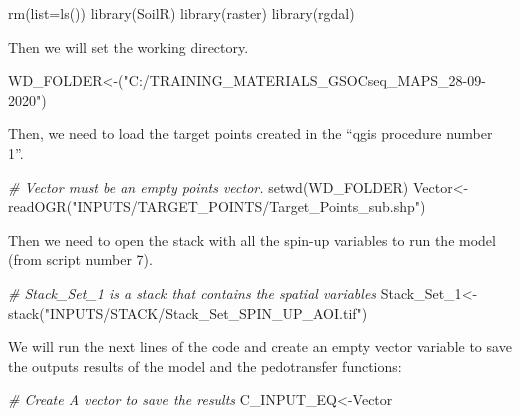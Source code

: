 \documentclass[
  10pt,
  b5paper,
]{book}
\newenvironment{Shaded}{\begin{snugshade}}{\end{snugshade}}
\newcommand{\AttributeTok}[1]{\textcolor[rgb]{0.77,0.63,0.00}{#1}}
\newcommand{\CommentTok}[1]{\textcolor[rgb]{0.56,0.35,0.01}{\textit{#1}}}
\newcommand{\FunctionTok}[1]{\textcolor[rgb]{0.00,0.00,0.00}{#1}}
\newcommand{\NormalTok}[1]{#1}
\newcommand{\OtherTok}[1]{\textcolor[rgb]{0.56,0.35,0.01}{#1}}
\newcommand{\StringTok}[1]{\textcolor[rgb]{0.31,0.60,0.02}{#1}}
\begin{document}
\begin{Shaded}
\begin{Highlighting}[]
\FunctionTok{rm}\NormalTok{(}\AttributeTok{list=}\FunctionTok{ls}\NormalTok{()) }
\FunctionTok{library}\NormalTok{(SoilR)}
\FunctionTok{library}\NormalTok{(raster)}
\FunctionTok{library}\NormalTok{(rgdal)}
\end{Highlighting}
\end{Shaded}

Then we will set the working directory.

\begin{Shaded}
\begin{Highlighting}[]
\NormalTok{WD\_FOLDER}\OtherTok{\textless{}{-}}\NormalTok{(}\StringTok{"C:/TRAINING\_MATERIALS\_GSOCseq\_MAPS\_28{-}09{-}2020"}\NormalTok{)}
\end{Highlighting}
\end{Shaded}

Then, we need to load the target points created in the ``qgis procedure number 1''.

\begin{Shaded}
\begin{Highlighting}[]
\CommentTok{\# Vector must be an empty points vector. }
\FunctionTok{setwd}\NormalTok{(WD\_FOLDER)}
\NormalTok{Vector}\OtherTok{\textless{}{-}}\FunctionTok{readOGR}\NormalTok{(}\StringTok{"INPUTS/TARGET\_POINTS/Target\_Points\_sub.shp"}\NormalTok{)}
\end{Highlighting}
\end{Shaded}

Then we need to open the stack with all the spin-up variables to run the model (from script number 7).

\begin{Shaded}
\begin{Highlighting}[]
\CommentTok{\# Stack\_Set\_1 is a stack that contains the spatial variables }
\NormalTok{Stack\_Set\_1}\OtherTok{\textless{}{-}} \FunctionTok{stack}\NormalTok{(}\StringTok{"INPUTS/STACK/Stack\_Set\_SPIN\_UP\_AOI.tif"}\NormalTok{)}
\end{Highlighting}
\end{Shaded}

We will run the next lines of the code and create an empty vector variable to save the outputs results of the model and the pedotransfer functions:

\begin{Shaded}
\begin{Highlighting}[]
\CommentTok{\# Create A vector to save the results}
\NormalTok{C\_INPUT\_EQ}\OtherTok{\textless{}{-}}\NormalTok{Vector}
\end{Highlighting}
\end{Shaded}
\end{document}
